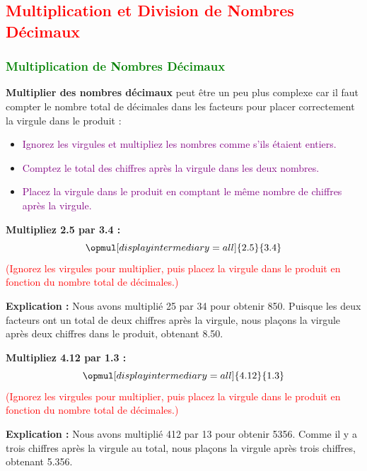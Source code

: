 \documentclass{article}
\begin{document}
\subsection{\textcolor{red}{Multiplication et Division de Nombres Décimaux}}

\subsubsection{\textcolor{green}{Multiplication de Nombres Décimaux}}

\vspace{0.25cm} 

\textbf{Multiplier des nombres décimaux} peut être un peu plus complexe car il faut compter le nombre total de décimales dans les facteurs pour placer correctement la virgule dans le produit :

    \begin{itemize}
        \item \textcolor{purple}{Ignorez les virgules et multipliez les nombres comme s'ils étaient entiers.}
        \item \textcolor{purple}{Comptez le total des chiffres après la virgule dans les deux nombres.}
        \item \textcolor{purple}{Placez la virgule dans le produit en comptant le même nombre de chiffres après la virgule.}
    \end{itemize}

\vspace{0.2cm}

\begin{tcolorbox}[colback=orange!10!white, colframe=orange!75!black, sharp corners=south, boxrule=0.8mm, title=Exemple de Multiplication]
    \textbf{Multipliez 2.5 par 3.4 :}
    \[
    \opmul[displayintermediary=all]{2.5}{3.4}
    \]
    \textcolor{red}{(Ignorez les virgules pour multiplier, puis placez la virgule dans le produit en fonction du nombre total de décimales.)}
    
    \textbf{Explication :} Nous avons multiplié 25 par 34 pour obtenir 850. Puisque les deux facteurs ont un total de deux chiffres après la virgule, nous plaçons la virgule après deux chiffres dans le produit, obtenant 8.50.
\end{tcolorbox}

\begin{tcolorbox}[colback=orange!10!white, colframe=orange!75!black, sharp corners=south, boxrule=0.8mm, title=Exemple de Multiplication]
    \textbf{Multipliez 4.12 par 1.3 :}
    \[
    \opmul[displayintermediary=all]{4.12}{1.3}
    \]
    \textcolor{red}{(Ignorez les virgules pour multiplier, puis placez la virgule dans le produit en fonction du nombre total de décimales.)}
    
    \textbf{Explication :} Nous avons multiplié 412 par 13 pour obtenir 5356. Comme il y a trois chiffres après la virgule au total, nous plaçons la virgule après trois chiffres, obtenant 5.356.
\end{tcolorbox}
\end{document}
